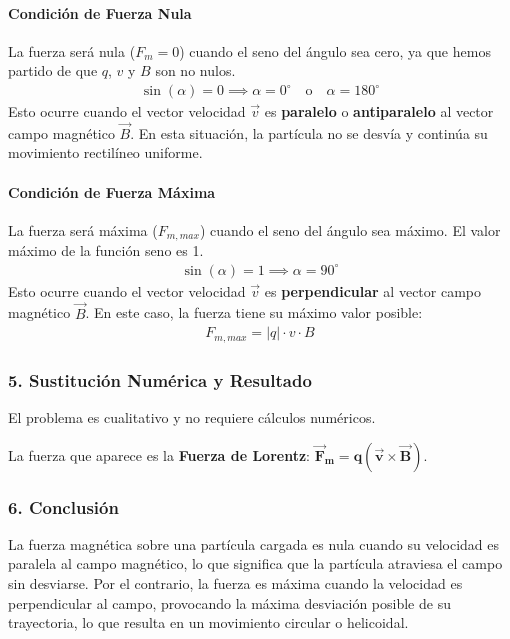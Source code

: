 \paragraph*{Condición de Fuerza Nula}
La fuerza será nula ($F_m = 0$) cuando el seno del ángulo sea cero, ya que hemos partido de que $q$, $v$ y $B$ son no nulos.
\begin{gather}
    \sin(\alpha) = 0 \implies \alpha = 0^\circ \quad \text{o} \quad \alpha = 180^\circ
\end{gather}
Esto ocurre cuando el vector velocidad $\vec{v}$ es \textbf{paralelo} o \textbf{antiparalelo} al vector campo magnético $\vec{B}$. En esta situación, la partícula no se desvía y continúa su movimiento rectilíneo uniforme.

\paragraph*{Condición de Fuerza Máxima}
La fuerza será máxima ($F_{m, max}$) cuando el seno del ángulo sea máximo. El valor máximo de la función seno es 1.
\begin{gather}
    \sin(\alpha) = 1 \implies \alpha = 90^\circ
\end{gather}
Esto ocurre cuando el vector velocidad $\vec{v}$ es \textbf{perpendicular} al vector campo magnético $\vec{B}$. En este caso, la fuerza tiene su máximo valor posible:
\begin{gather}
    F_{m, max} = |q| \cdot v \cdot B
\end{gather}

\subsubsection*{5. Sustitución Numérica y Resultado}
El problema es cualitativo y no requiere cálculos numéricos.
\begin{cajaresultado}
La fuerza que aparece es la \textbf{Fuerza de Lorentz}: $\boldsymbol{\vec{F}_m = q (\vec{v} \times \vec{B})}$.
\end{cajaresultado}

\subsubsection*{6. Conclusión}
\begin{cajaconclusion}
La fuerza magnética sobre una partícula cargada es nula cuando su velocidad es paralela al campo magnético, lo que significa que la partícula atraviesa el campo sin desviarse. Por el contrario, la fuerza es máxima cuando la velocidad es perpendicular al campo, provocando la máxima desviación posible de su trayectoria, lo que resulta en un movimiento circular o helicoidal.
\end{cajaconclusion}

